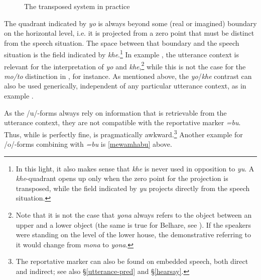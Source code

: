 \begin{figure}
\centering
\setlength{\fboxsep}{0pt}
\caption{The transposed system in practice}\label{deixill-3}
\end{figure}

The quadrant indicated by \emph{yo} is always beyond some (real or imagined) boundary on the horizontal level, i.e. it is projected from a zero point that must be distinct from the speech situation. The space between that boundary and the speech situation is the field indicated by \emph{khe}.\footnote{In this light, it also makes sense that \emph{khe} is never used in opposition to \emph{yu}. A \emph{khe}-quadrant opens up only when the zero point for the projection is transposed, while the field indicated by \emph{yu} projects directly from the speech situation.} In  example \Last[a], the  utterance context is relevant for the interpretation of \emph{yo} and \emph{khe},\footnote{Note that it is not the case that \emph{yona} always refers to the object between an upper and a lower object (the same is true for Belhare, see \citet{Bickel2001Deictic}).  If the speakers were standing on the level of the lower house, the demonstrative referring to it would change from \emph{mona} to \emph{yona}.} while this is not the case for the \emph{mo/to} distinction in \LLast[b], for instance. As mentioned above, the \emph{yo}/\emph{khe}  contrast can also be used generically, independent  of any particular utterance context, as in example  \Last[b].
 
As the /u/-forms always rely on information that is retrievable from the utterance context, they are not compatible with the reportative marker \emph{=bu}. Thus, while \Next[a] is perfectly fine, \Next[b] is pragmatically awkward.\footnote{The reportative marker can also be found on embedded speech, both direct and indirect; see also §\ref{utterance-pred} and §\ref{hearsay}.} Another example for /o/-forms combining with \emph{=bu} is \ref{mewamhabu} above.

